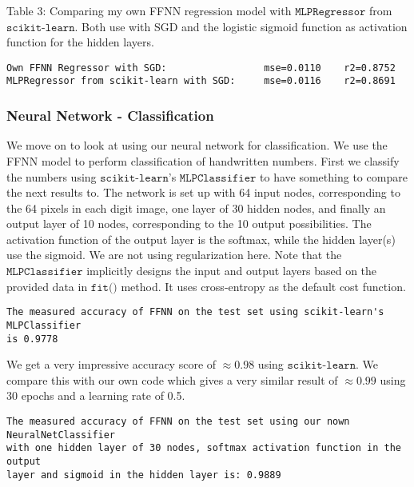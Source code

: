 \documentclass[11pt]{article}
\begin{document}
    Table 3: Comparing my own FFNN regression model with
\(\texttt{MLPRegressor}\) from \(\texttt{scikit-learn}\). Both use with
SGD and the logistic sigmoid function as activation function for the
hidden layers.


    \begin{Verbatim}[commandchars=\\\{\}]
Own FFNN Regressor with SGD:                 mse=0.0110    r2=0.8752
MLPRegressor from scikit-learn with SGD:     mse=0.0116    r2=0.8691
    \end{Verbatim}

    \hypertarget{neural-network---classification}{%
\subsubsection{Neural Network -
Classification}\label{neural-network---classification}}

We move on to look at using our neural network for classification. We
use the FFNN model to perform classification of handwritten numbers.
First we classify the numbers using \(\texttt{scikit-learn}\)'s
\(\texttt{MLPClassifier}\) to have something to compare the next results
to. The network is set up with 64 input nodes, corresponding to the 64
pixels in each digit image, one layer of 30 hidden nodes, and finally an
output layer of 10 nodes, corresponding to the 10 output possibilities.
The activation function of the output layer is the softmax, while the
hidden layer(s) use the sigmoid. We are not using regularization here.
Note that the \(\texttt{MLPClassifier}\) implicitly designs the input
and output layers based on the provided data in \(\texttt{fit()}\)
method. It uses cross-entropy as the default cost function.

    \begin{Verbatim}[commandchars=\\\{\}]
The measured accuracy of FFNN on the test set using scikit-learn's MLPClassifier
is 0.9778
    \end{Verbatim}

    We get a very impressive accuracy score of \(\approx0.98\) using
\(\texttt{scikit-learn}\). We compare this with our own code which gives
a very similar result of \(\approx0.99\) using 30 epochs and a learning
rate of 0.5.

    \begin{Verbatim}[commandchars=\\\{\}]
The measured accuracy of FFNN on the test set using our nown NeuralNetClassifier
with one hidden layer of 30 nodes, softmax activation function in the output
layer and sigmoid in the hidden layer is: 0.9889
    \end{Verbatim}
\end{document}
